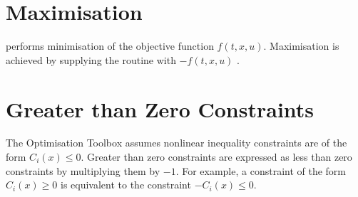 \section{Maximisation}
\label{sec:maximisation}

 performs minimisation of the objective
function $f(t,x,u)$. Maximisation is achieved by supplying the
routine with $-f(t,x,u)$ . 

\section{Greater than Zero Constraints}
\label{sec:zeroconstraints}

The Optimisation Toolbox assumes nonlinear inequality constraints are
of the form $C_{i}(x)\leq 0$. Greater than zero constraints are
expressed as less than zero constraints by multiplying them by $-1$. For
example, a constraint of the form $C_{i}(x)\geq 0$ is equivalent to the
constraint $-C_{i}(x)\leq 0$. 



